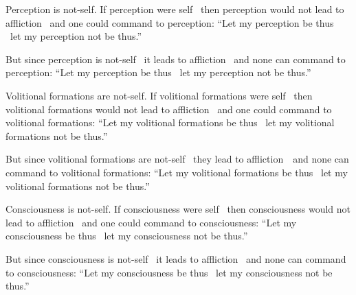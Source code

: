 \begin{english-only-hang}
  Perception is not-self. If perception were self \breathmark\ then perception would not lead to affliction \breathmark\ and one could command to perception: ``Let my perception be thus \breathmark\ let my perception not be thus.''
\end{english-only-hang}
\begin{english-only-hangtogether}
  But since perception is not-self \breathmark\ it leads to affliction \breathmark\ and none can command to perception: ``Let my perception be thus \breathmark\ let my perception not be thus.''
\end{english-only-hangtogether}

\begin{english-only-hang}
  Volitional formations are not-self. If volitional formations were self \breathmark\ then volitional formations would not lead to affliction \breathmark\ and one could command to volitional formations: ``Let my volitional formations be thus \breathmark\ let my volitional formations not be thus.''
\end{english-only-hang}
\begin{english-only-hangtogether}
  But since volitional formations are not-self \breathmark\ they lead to \mbox{affliction}~\breathmark\ and none can command to volitional formations: ``Let my volitional formations be thus \breathmark\ let my volitional formations not be thus.''
\end{english-only-hangtogether}

\begin{english-only-hang}
  Consciousness is not-self. If consciousness were self \breathmark\ then consciousness would not lead to affliction \breathmark\ and one could command to consciousness: ``Let my consciousness be thus \breathmark\ let my consciousness not be thus.''
\end{english-only-hang}
\begin{english-only-hangtogether}
  But since consciousness is not-self \breathmark\ it leads to affliction \breathmark\ and none can command to consciousness: ``Let my consciousness be thus \breathmark\ let my consciousness not be thus.''
\end{english-only-hangtogether}

